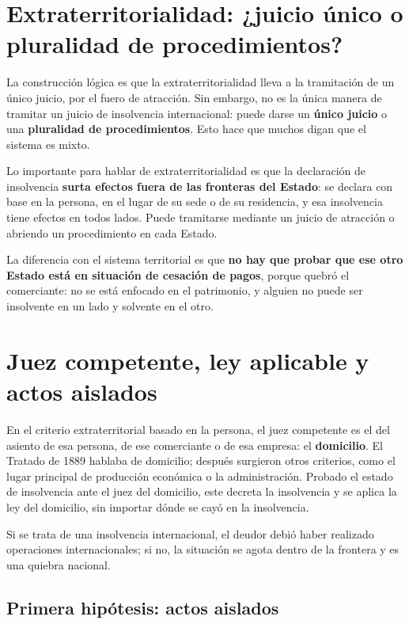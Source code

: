 \documentclass[12pt,oneside]{book}
\begin{document}
\section{Extraterritorialidad: ¿juicio único o pluralidad de procedimientos?}

La construcción lógica es que la extraterritorialidad lleva a la tramitación de un único juicio, por el fuero de atracción. Sin embargo, no es la única manera de tramitar un juicio de insolvencia internacional: puede darse un \textbf{único juicio} o una \textbf{pluralidad de procedimientos}. Esto hace que muchos digan que el sistema es mixto.

Lo importante para hablar de extraterritorialidad es que la declaración de insolvencia \textbf{surta efectos fuera de las fronteras del Estado}: se declara con base en la persona, en el lugar de su sede o de su residencia, y esa insolvencia tiene efectos en todos lados. Puede tramitarse mediante un juicio de atracción o abriendo un procedimiento en cada Estado.

La diferencia con el sistema territorial es que \textbf{no hay que probar que ese otro Estado está en situación de cesación de pagos}, porque quebró el comerciante: no se está enfocado en el patrimonio, y alguien no puede ser insolvente en un lado y solvente en el otro.

\section{Juez competente, ley aplicable y actos aislados}

En el criterio extraterritorial basado en la persona, el juez competente es el del asiento de esa persona, de ese comerciante o de esa empresa: el \textbf{domicilio}. El Tratado de 1889 hablaba de domicilio; después surgieron otros criterios, como el lugar principal de producción económica o la administración. Probado el estado de insolvencia ante el juez del domicilio, este decreta la insolvencia y se aplica la ley del domicilio, sin importar dónde se cayó en la insolvencia.

Si se trata de una insolvencia internacional, el deudor debió haber realizado operaciones internacionales; si no, la situación se agota dentro de la frontera y es una quiebra nacional.

\subsection{Primera hipótesis: actos aislados}
\end{document}
